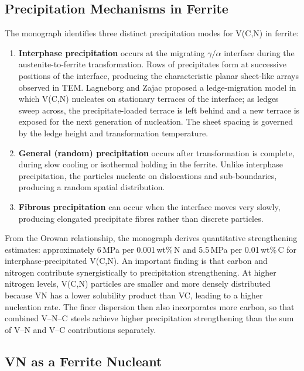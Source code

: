\documentclass[11pt,a4paper]{article}
\begin{document}
\subsection{Precipitation Mechanisms in Ferrite}

The monograph identifies three distinct precipitation modes for V(C,N)
in ferrite:

\begin{enumerate}
  \item \textbf{Interphase precipitation} occurs at the migrating
    $\gamma/\alpha$ interface during the austenite-to-ferrite
    transformation.  Rows of precipitates form at successive positions of
    the interface, producing the characteristic planar sheet-like arrays
    observed in TEM.  Lagneborg and Zajac \cite{LagneborgZajac2001}
    proposed a ledge-migration model in which V(C,N) nucleates on
    stationary terraces of the interface; as ledges sweep across, the
    precipitate-loaded terrace is left behind and a new terrace is
    exposed for the next generation of nucleation.  The sheet spacing is
    governed by the ledge height and transformation temperature.

  \item \textbf{General (random) precipitation} occurs after
    transformation is complete, during slow cooling or isothermal holding
    in the ferrite.  Unlike interphase precipitation, the particles
    nucleate on dislocations and sub-boundaries, producing a random
    spatial distribution.

  \item \textbf{Fibrous precipitation} can occur when the interface
    moves very slowly, producing elongated precipitate fibres rather than
    discrete particles.
\end{enumerate}

From the Orowan relationship, the monograph derives quantitative
strengthening estimates: approximately 6\,MPa per 0.001\,wt\%\,N and
5.5\,MPa per 0.01\,wt\%\,C for interphase-precipitated V(C,N).  An
important finding is that carbon and nitrogen contribute synergistically
to precipitation strengthening.  At higher nitrogen levels, V(C,N)
particles are smaller and more densely distributed because VN has a
lower solubility product than VC, leading to a higher nucleation rate.
The finer dispersion then also incorporates more carbon, so that
combined V--N--C steels achieve higher precipitation strengthening than
the sum of V--N and V--C contributions separately.

\subsection{VN as a Ferrite Nucleant}
\end{document}
